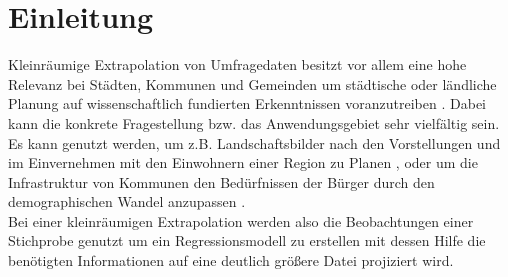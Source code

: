 \documentclass{Vorlage}
\begin{document}
\restoregeometry


\pagestyle{plain}

\tableofcontents %

\newpage %

\listoffigures %

\newpage

\listoftables %

\newpage



\pagestyle{fancy}

\section{Einleitung}
Kleinräumige Extrapolation von Umfragedaten besitzt vor allem eine hohe Relevanz bei Städten, Kommunen und Gemeinden um städtische oder ländliche Planung auf wissenschaftlich fundierten Erkenntnissen voranzutreiben \cite{Planung}. Dabei kann die konkrete Fragestellung bzw. das Anwendungsgebiet sehr vielfältig sein. Es kann genutzt werden, um z.B. Landschaftsbilder nach den Vorstellungen und im Einvernehmen mit den Einwohnern einer Region zu Planen \cite{Natur}, oder um die Infrastruktur von Kommunen den Bedürfnissen der Bürger durch den demographischen Wandel anzupassen \cite{Lubeck}.\\

Bei einer kleinräumigen Extrapolation werden also die Beobachtungen einer Stichprobe genutzt um ein Regressionsmodell zu erstellen mit dessen Hilfe die benötigten Informationen auf eine deutlich größere Datei projiziert wird.
\end{document}
